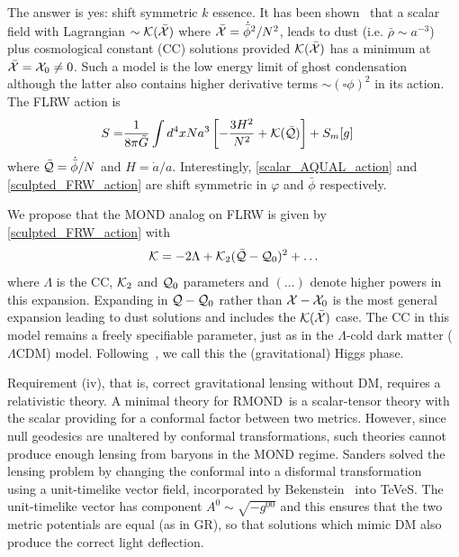 \documentclass[twocolumn,prl,preprintnumbers,amsmath,amssymb,nofootinbib]{revtex4-2}
\newcommand{\rhob}{{\bar{\rho}}}
\newcommand{\phib}{{\bar{\phi}}}
\newcommand{\RMOND}{RMOND~}
\newcommand{\Kcal}{{\cal K}}
\newcommand{\Xcal}{{\cal X}}
\newcommand{\Qcalb}{\bar{{\cal Q}}}
\newcommand{\Qcal}{{\cal Q}}
\newcommand{\Xcalb}{\bar{{\cal X}}}
\newcommand{\Gt}{\ensuremath{\tilde{G}}}
\begin{document}
 The answer is yes: shift symmetric $k$ essence.
 It has been shown~\cite{Scherrer2004} that a scalar field with Lagrangian $\sim \Kcal(\Xcalb)$ where $\Xcalb = \dot{\phib}^2/N^2$, 
leads to dust (i.e.  $\rhob \sim a^{-3}$) plus cosmological constant (CC) solutions provided $\Kcal(\Xcalb)$ has a minimum at $\Xcalb = \Xcal_0 \ne 0$. 
Such a model is the low energy limit of ghost condensation~\cite{ArkaniHamedEtAl2003,ArkaniHamed:2005gu} although the latter also
contains higher derivative terms $\sim (\square\phi)^2$ in its action.  The FLRW action is
\begin{align}
S =&  
\frac{1}{8\pi \Gt} \int d^4x N a^3 \left[
 -\frac{3H^2}{N^2}
+ \Kcal(\Qcalb) \right] + S_m[g]
\label{sculpted_FRW_action}
\end{align}
where %
$\Qcalb = \dot{\phib}/N$
and $H = \dot{a}/a$.
Interestingly,
 \eqref{scalar_AQUAL_action} and 
\eqref{sculpted_FRW_action}  are shift symmetric in $\varphi$ and $\phib$ respectively. 

We propose that the MOND analog on FLRW is given by
\eqref{sculpted_FRW_action} with 
\begin{equation}
\Kcal = -2\Lambda + \Kcal_2(\Qcalb - \Qcal_0)^2 + \ldots
\label{Kcal_expansion}
\end{equation}
 where $\Lambda$ is the CC,  $\Kcal_2$ and $\Qcal_0$  parameters and $(\ldots)$ denote higher powers in this expansion.
Expanding in $\Qcal-\Qcal_0$ rather than $\Xcal-\Xcal_0$ is the most general expansion leading to dust solutions and includes the $\Kcal(\Xcalb)$ case.
The CC in this model remains a freely specifiable parameter, just as in the $\Lambda$-cold dark matter ($\Lambda$CDM) model. Following~\cite{ArkaniHamedEtAl2003,ArkaniHamed:2005gu},
we call this the (gravitational) Higgs phase.

Requirement (iv), that is, correct gravitational lensing without DM, requires a relativistic theory. 
A minimal theory for \RMOND is a scalar-tensor theory\cite{BekensteinMilgrom1984} with the scalar providing for a conformal factor between two metrics.
However, since null geodesics are unaltered by conformal transformations, such theories cannot produce enough lensing from baryons in the MOND regime.
Sanders solved the lensing problem by changing the conformal into a disformal transformation~\cite{Sanders1997} using a unit-timelike vector field, 
 incorporated by Bekenstein~\cite{Bekenstein2004} into TeVeS. The unit-timelike vector 
has component $A^0 \sim \sqrt{-g^{00}}$ and this ensures that the two metric potentials are equal (as in GR), so that solutions which mimic DM
also produce the correct light deflection.
\end{document}
